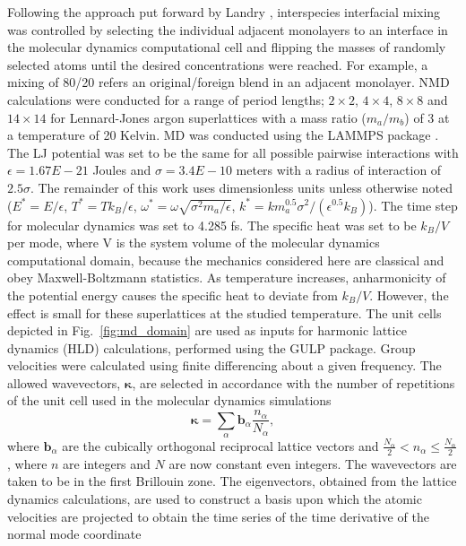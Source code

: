 \documentclass[aps,prb,preprint,preprintnumbers,amsmath,amssymb,floatfix,superscriptaddress]{revtex4}
\begin{document}
Following the approach put forward by Landry \cite{PhysRevB.79.075316}, interspecies interfacial mixing was controlled by selecting the individual adjacent monolayers to an interface in the molecular dynamics computational cell and flipping the masses of randomly selected atoms until the desired concentrations were reached. For example, a mixing of 80/20 refers an original/foreign blend in an adjacent monolayer. NMD calculations were conducted for a range of period lengths; $2\times2$, $4\times4$, $8\times8$ and $14\times14$ for Lennard-Jones argon superlattices with a mass ratio ($m_a/m_b$) of 3 at a temperature of 20 Kelvin. MD was conducted using the LAMMPS package \cite{LAMMPS}. The LJ potential was set to be the same for all possible pairwise interactions with $\epsilon= 1.67E-21$ Joules and $\sigma= 3.4E-10$ meters with a radius of interaction of $2.5\sigma$. The remainder of this work uses dimensionless units unless otherwise noted ($E^*=E/\epsilon$, $T^*=Tk_B/\epsilon$, $\omega^*=\omega\sqrt{\sigma^2m_a/\epsilon}$, $k^*=km^{0.5}_a\sigma^2/(\epsilon^{0.5}k_B)$). The time step for molecular dynamics was set to 4.285 fs. The specific heat was set to be $k_B/V$ per mode, where V is the system volume of the molecular dynamics computational domain, because the mechanics considered here are classical and obey Maxwell-Boltzmann statistics. As temperature increases, anharmonicity of the potential energy causes the specific heat to deviate from $k_B/V$. However, the effect is small for these superlattices at the studied temperature\cite{jason_inpress}. The unit cells depicted in Fig.~\ref{fig:md_domain} are used as inputs for harmonic lattice dynamics (HLD) calculations, performed using the GULP package\cite{GULP}. Group velocities were calculated using finite differencing about a given frequency. The allowed wavevectors, $\pmb{\kappa}$, are selected in accordance with the number of repetitions of the unit cell used in the molecular dynamics simulations
\begin{equation}\label{EQ:NMD:allowdkpt}
\pmb{\kappa} = \sum_{\alpha} \pmb{b}_{\alpha} \frac{n_{\alpha}}{N_{\alpha}},
\end{equation}
where $\pmb{b}_\alpha$ are the cubically orthogonal reciprocal lattice vectors and $ \frac{N_\alpha}{2} < n_\alpha \le \frac {N_\alpha}{2}$, where $n$ are integers and $N$ are now constant even integers. The wavevectors are taken to be in the first Brillouin zone. The eigenvectors, obtained from the lattice dynamics calculations, are used to construct a basis upon which the atomic velocities are projected to obtain the time series of the time derivative of the normal mode coordinate 
\end{document}
